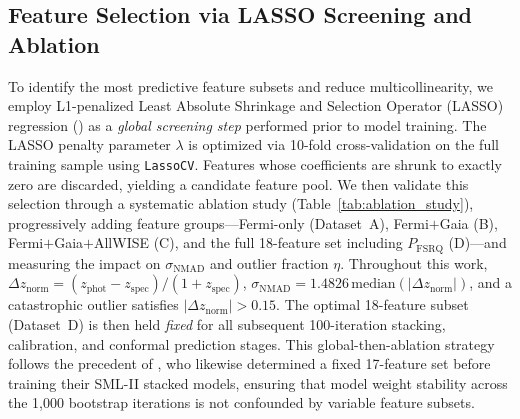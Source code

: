\documentclass[twocolumn,linenumbers,floatfix]{aastex701}
\begin{document}
\subsection{Feature Selection via LASSO Screening and Ablation}
\label{sec:lasso}
To identify the most predictive feature subsets and reduce multicollinearity, we employ L1-penalized Least Absolute Shrinkage and Selection Operator (LASSO) regression (\citealt{Tibshirani1996}) as a \emph{global screening step} performed prior to model training.
The LASSO penalty parameter $\lambda$ is optimized via 10-fold cross-validation on the full training sample using \texttt{LassoCV}.
Features whose coefficients are shrunk to exactly zero are discarded, yielding a candidate feature pool.
We then validate this selection through a systematic ablation study (Table~\ref{tab:ablation_study}), progressively adding feature groups---Fermi-only (Dataset~A), Fermi$+$Gaia (B), Fermi$+$Gaia$+$AllWISE (C), and the full 18-feature set including $P_{\mathrm{FSRQ}}$ (D)---and measuring the impact on $\sigma_{\mathrm{NMAD}}$ and outlier fraction $\eta$. Throughout this work, $\Delta z_{\mathrm{norm}}=(z_{\mathrm{phot}}-z_{\mathrm{spec}})/(1+z_{\mathrm{spec}})$, $\sigma_{\mathrm{NMAD}}=1.4826\,\mathrm{median}(|\Delta z_{\mathrm{norm}}|)$, and a catastrophic outlier satisfies $|\Delta z_{\mathrm{norm}}|>0.15$.
The optimal 18-feature subset (Dataset~D) is then held \emph{fixed} for all subsequent 100-iteration stacking, calibration, and conformal prediction stages.
This global-then-ablation strategy follows the precedent of \citet{Narendra2022}, who likewise determined a fixed 17-feature set before training their SML-II stacked models, ensuring that model weight stability across the 1{,}000 bootstrap iterations is not confounded by variable feature subsets.
\end{document}
